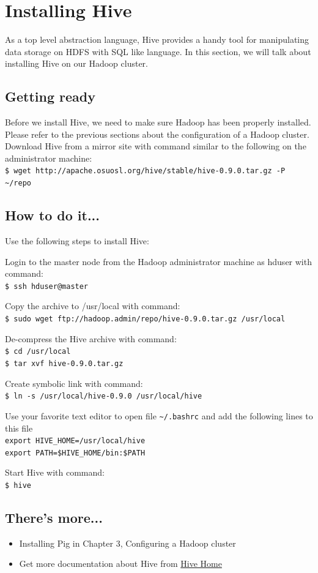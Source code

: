 \section{Installing Hive}
As a top level abstraction language, Hive provides a handy tool for manipulating data storage on HDFS with SQL like language. In this section, we will talk about installing Hive on our Hadoop cluster.

\subsection*{Getting ready}
Before we install Hive, we need to make sure Hadoop has been properly installed. Please refer to the previous sections about the configuration of a Hadoop cluster. \\
Download Hive from a mirror site with command similar to the following on the administrator machine: \\
\verb|$ wget http://apache.osuosl.org/hive/stable/hive-0.9.0.tar.gz -P ~/repo|

\subsection*{How to do it...}
Use the following steps to install Hive:

Login to the master node from the Hadoop administrator machine as hduser with command: \\
\verb|$ ssh hduser@master|

Copy the archive to /usr/local with command: \\
\verb|$ sudo wget ftp://hadoop.admin/repo/hive-0.9.0.tar.gz /usr/local|

De-compress the Hive archive with command:\\
\verb|$ cd /usr/local| \\
\verb|$ tar xvf hive-0.9.0.tar.gz|

Create symbolic link with command: \\
\verb|$ ln -s /usr/local/hive-0.9.0 /usr/local/hive|

Use your favorite text editor to open file \verb|~/.bashrc| and add the following lines to this file \\
\verb|export HIVE_HOME=/usr/local/hive| \\
\verb|export PATH=$HIVE_HOME/bin:$PATH|

Start Hive with command: \\
\verb|$ hive|
\subsection*{There's more...}
\begin{itemize}
  \item Installing Pig in Chapter 3, Configuring a Hadoop cluster
  \item Get more documentation about Hive from \href{https://cwiki.apache.org/confluence/display/Hive/Home}{Hive Home}
\end{itemize}

